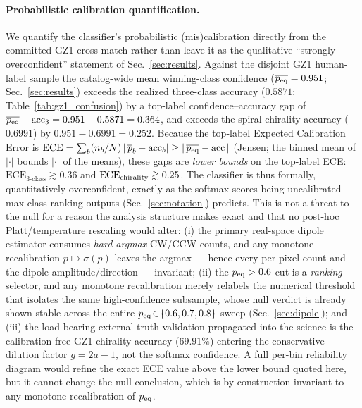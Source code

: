 \documentclass[aps,prd,twocolumn,superscriptaddress,preprintnumbers,nofootinbib,longbibliography,floatfix]{revtex4-2}
\begin{document}
\paragraph{Probabilistic calibration quantification.}
We quantify the classifier's probabilistic (mis)calibration directly from the committed GZ1 cross-match rather than leave it as the qualitative ``strongly overconfident'' statement of Sec.~\ref{sec:results}. Against the disjoint GZ1 human-label sample the catalog-wide mean winning-class confidence ($\overline{p_{\rm eq}}=0.951$; Sec.~\ref{sec:results}) exceeds the realized three-class accuracy ($0.5871$; Table~\ref{tab:gz1_confusion}) by a top-label confidence--accuracy gap of $\overline{p_{\rm eq}}-\mathrm{acc}_3 = 0.951-0.5871 = 0.364$, and exceeds the spiral-chirality accuracy ($0.6991$) by $0.951-0.6991=0.252$. Because the top-label Expected Calibration Error is $\mathrm{ECE}=\sum_b (n_b/N)\,|\,\overline{p}_b-\mathrm{acc}_b|\ge|\,\overline{p_{\rm eq}}-\mathrm{acc}\,|$ (Jensen; the binned mean of $|\cdot|$ bounds $|\cdot|$ of the means), these gaps are \emph{lower bounds} on the top-label ECE: $\mathrm{ECE}_{3\text{-class}}\gtrsim0.36$ and $\mathrm{ECE}_{\rm chirality}\gtrsim0.25$. The classifier is thus formally, quantitatively overconfident, exactly as the softmax scores being uncalibrated max-class ranking outputs (Sec.~\ref{sec:notation}) predicts. This is not a threat to the null for a reason the analysis structure makes exact and that no post-hoc Platt/temperature rescaling would alter: (i) the primary real-space dipole estimator consumes \emph{hard argmax} CW/CCW counts, and any monotone recalibration $p\mapsto\sigma(p)$ leaves the argmax --- hence every per-pixel count and the dipole amplitude/direction --- invariant; (ii) the $p_{\rm eq}>0.6$ cut is a \emph{ranking} selector, and any monotone recalibration merely relabels the numerical threshold that isolates the same high-confidence subsample, whose null verdict is already shown stable across the entire $p_{\rm eq}\!\in\!\{0.6,0.7,0.8\}$ sweep (Sec.~\ref{sec:dipole}); and (iii) the load-bearing external-truth validation propagated into the science is the calibration-free GZ1 chirality accuracy ($69.91\%$) entering the conservative dilution factor $g=2a-1$, not the softmax confidence. A full per-bin reliability diagram would refine the exact ECE value above the lower bound quoted here, but it cannot change the null conclusion, which is by construction invariant to any monotone recalibration of $p_{\rm eq}$.
\end{document}
